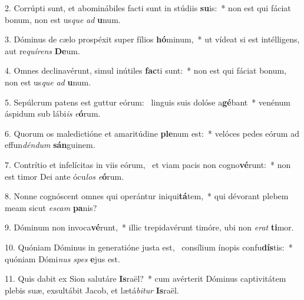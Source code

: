 2. Corrúpti sunt, et abominábiles facti sunt in stúdiis \textbf{su}is:~*  non est qui fáciat bonum, non est us\textit{que} \textit{ad} \textbf{u}num.\

3. Dóminus de cælo prospéxit super fílios \textbf{hó}minum,~*  ut vídeat si est intélligens, aut re\textit{quí}\textit{rens} \textbf{De}um.\

4. Omnes declinavérunt, simul inútiles \textbf{fac}ti sunt:~*  non est qui fáciat bonum, non est us\textit{que} \textit{ad} \textbf{u}num.\

5. Sepúlcrum patens est guttur eórum: \dag\  linguis suis dolóse a\textbf{gé}bant~*  venénum áspidum sub lábi\textit{is} \textit{e}\textbf{ó}rum.\

6. Quorum os maledictióne et amaritúdine \textbf{ple}num est:~*  velóces pedes eórum ad effun\textit{dén}\textit{dum} \textbf{sán}guinem.\

7. Contrítio et infelícitas in viis eórum, \dag\  et viam pacis non cogno\textbf{vé}runt:~*  non est timor Dei ante ócu\textit{los} \textit{e}\textbf{ó}rum.\

8. Nonne cognóscent omnes qui operántur iniqui\textbf{tá}tem,~*  qui dévorant plebem meam sicut \textit{es}\textit{cam} \textbf{pa}nis?\

9. Dóminum non invoca\textbf{vé}runt,~*  illic trepidavérunt timóre, ubi non \textit{e}\textit{rat} \textbf{ti}mor.\

10. Quóniam Dóminus in generatióne justa est, \dag\  consílium ínopis confu\textbf{dís}tis:~*  quóniam Dómi\textit{nus} \textit{spes} \textbf{e}jus est.\

11. Quis dabit ex Sion salutáre \textbf{Is}raël?~*  cum avérterit Dóminus captivitátem plebis suæ, exsultábit Jacob, et lætá\textit{bi}\textit{tur} \textbf{Is}raël.\

